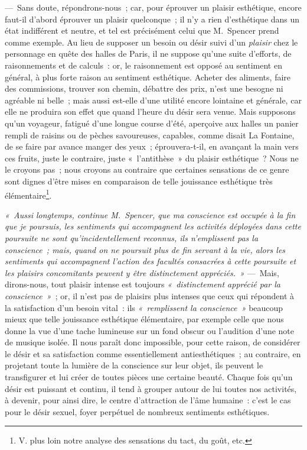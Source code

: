 \documentclass[french,twoside]{book} %
\begin{document}
— Sans doute, répondrons-nous ; car, pour éprouver un plaisir esthétique, encore faut-il d’abord éprouver un plaisir quelconque ; il n’y a rien d’esthétique dans un état indifférent et neutre, et tel est précisément celui que  M. Spencer prend comme exemple. Au lieu de supposer un besoin ou désir suivi d’un \emph{plaisir} chez le personnage en quête des halles de Paris, il ne suppose qu’une suite d’efforts, de raisonnements et de calculs : or, le raisonnement est opposé au sentiment en général, à plus forte raison au sentiment esthétique. Acheter des aliments, faire des commissions, trouver son chemin, débattre des prix, n’est une besogne ni agréable ni belle ; mais aussi est-elle d’une utilité encore lointaine et générale, car elle ne produira son effet que quand l’heure du désir sera venue. Mais supposons qu’un voyageur, fatigué d’une longue course d’été, aperçoive aux halles un panier rempli de raisins ou de pèches savoureuses, capables, comme disait La Fontaine, de se faire par avance manger des yeux ; éprouvera-t-il, en avançant la main vers ces fruits, juste le contraire, juste « l’antithèse » du plaisir esthétique ? Nous ne le croyons pas ; nous croyons au contraire que certaines sensations de ce genre sont dignes d’être mises en comparaison de telle jouissance esthétique très élémentaire\footnote{V. plus loin notre analyse des sensations du tact, du goût, etc.}.\par
\emph{« Aussi longtemps, continue M. Spencer, que ma conscience est occupée à la fin que je poursuis, les sentiments qui accompagnent les activités déployées dans cette poursuite ne sont qu’incidentellement reconnus, ils \emph{n’emplissent pas la conscience} ; mais, quand on ne poursuit plus de fin servant à la vie, alors les sentiments qui accompagnent l’action des facultés consacrées à cette poursuite et les  plaisirs concomitants peuvent y être distinctement appréciés. »} — Mais, dirons-nous, tout plaisir intense est toujours \emph{« distinctement apprécié par la conscience »} ; or, il n’est pas de plaisirs plus intenses que ceux qui répondent à la satisfaction d’un besoin vital : ils \emph{« remplissent la conscience »} beaucoup mieux que telle jouissance esthétique élémentaire, par exemple celle que nous donne la vue d’une tache lumineuse sur un fond obscur ou l’audition d’une note de musique isolée. Il nous paraît donc impossible, pour cette raison, de considérer le désir et sa satisfaction comme essentiellement antiesthétiques ; au contraire, en projetant toute la lumière de la conscience sur leur objet, ils peuvent le transfigurer et lui créer de toutes pièces une certaine beauté. Chaque fois qu’un désir est puissant et continu, il tend à grouper autour de lui toutes nos activités, à devenir, pour ainsi dire, le centre d’attraction de l’âme humaine : c’est le cas pour le désir sexuel, foyer perpétuel de nombreux sentiments esthétiques.\par
\end{document}
